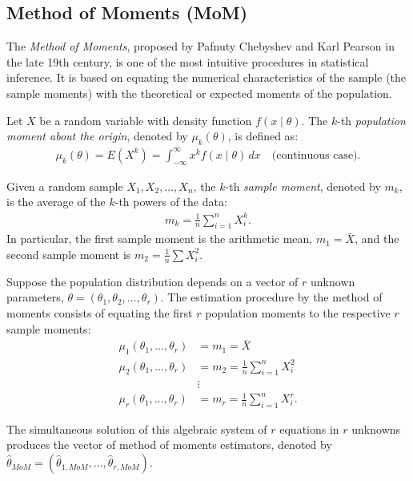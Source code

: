 \subsection{Method of Moments (MoM)}

The \emph{Method of Moments}, proposed by Pafnuty Chebyshev and Karl Pearson in the late 19th century, is one of the most intuitive procedures in statistical inference. It is based on equating the numerical characteristics of the sample (the sample moments) with the theoretical or expected moments of the population.

\begin{definicion}
	Let $X$ be a random variable with density function $f(x \mid \theta)$. The $k$-th \emph{population moment about the origin}, denoted by $\mu_k(\theta)$, is defined as:
	\begin{align}
		\mu_k(\theta) = E(X^k) = \int_{-\infty}^{\infty} x^k f(x \mid \theta) \, dx \quad \text{(continuous case)}.
	\end{align}

	Given a random sample $X_1, X_2, \ldots, X_n$, the $k$-th \emph{sample moment}, denoted by $m_k$, is the average of the $k$-th powers of the data:
	\begin{align}
		m_k = \frac{1}{n} \sum_{i=1}^n X_i^k.
	\end{align}
	In particular, the first sample moment is the arithmetic mean, $m_1 = \bar{X}$, and the second sample moment is $m_2 = \frac{1}{n}\sum X_i^2$.
\end{definicion}

\begin{teorema}
	Suppose the population distribution depends on a vector of $r$ unknown parameters, $\theta = (\theta_1, \theta_2, \ldots, \theta_r)$. The estimation procedure by the method of moments consists of equating the first $r$ population moments to the respective $r$ sample moments:
	\begin{align}
		\mu_1(\theta_1, \ldots, \theta_r) &= m_1 = \bar{X} \nonumber \\
		\mu_2(\theta_1, \ldots, \theta_r) &= m_2 = \frac{1}{n}\sum_{i=1}^n X_i^2 \nonumber \\
		&\vdots \nonumber \\
		\mu_r(\theta_1, \ldots, \theta_r) &= m_r = \frac{1}{n}\sum_{i=1}^n X_i^r.
		\label{eq:mom_sistema}
	\end{align}

	The simultaneous solution of this algebraic system of $r$ equations in $r$ unknowns produces the vector of method of moments estimators, denoted by $\hat{\theta}_{MoM} = (\hat{\theta}_{1, MoM}, \ldots, \hat{\theta}_{r, MoM})$.
\end{teorema}

